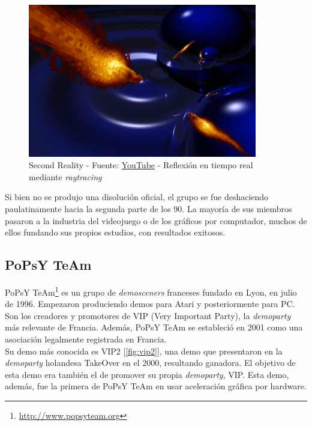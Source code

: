 \begin{figure}[h]
	\centering
	\includegraphics[width=10cm]{archivos/second-reality}
	\caption{Second Reality - Fuente: \href{https://www.youtube.com/watch?v=XezcZVu66QI}{YouTube} -  Reflexión en tiempo real mediante \emph{raytracing}}
	\label{fig:secondreality}
\end{figure}

Si bien no se produjo una disolución oficial, el grupo se fue deshaciendo paulatinamente hacia la segunda parte de los 90. La mayoría de sus miembros pasaron a la industria del videojuego o de los gráficos por computador, muchos de ellos fundando sus propios estudios, con resultados exitosos.

\subsection{PoPsY TeAm}

PoPsY TeAm\footnote{\url{http://www.popsyteam.org}} es un grupo de \emph{demosceners} franceses fundado en Lyon, en julio de 1996. Empezaron produciendo demos para Atari y posteriormente para PC.\\

Son los creadores y promotores de VIP (Very Important Party), la \emph{demoparty} más relevante de Francia. Además, PoPsY TeAm se estableció en 2001 como una asociación legalmente registrada en Francia.\\

Su demo más conocida es VIP2 [\ref{fig:vip2}], una demo que presentaron en la \emph{demoparty} holandesa TakeOver en el 2000, resultando ganadora. El objetivo de esta demo era también el de promover su propia \emph{demoparty}, VIP. Esta demo, además, fue la primera de PoPsY TeAm en usar aceleración gráfica por hardware.\\

